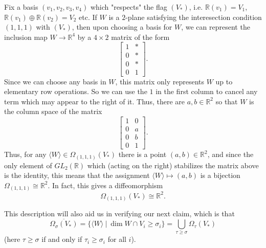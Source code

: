 \documentclass{amsart}          %
\begin{document}
Fix a basis $(v_1, v_2, v_3, v_4)$ which "respects" the flag $(V_{\ast})$, i.e. $\mathbb{R}(v_1) = V_1$, $\mathbb{R}(v_1) \oplus \mathbb{R}(v_2) = V_2$ etc. If $W$ is a $2$-plane satisfying the interesection condition $(1, 1, 1)$ with $(V_{\ast})$, then upon choosing a basis for $W$, we can represent the inclusion map $W\rightarrow \mathbb{R}^4$ by a $4\times 2$ matrix of the form
\[
\begin{bmatrix}
    1 & \ast \\
    0 & \ast \\
    0 & \ast \\
    0 & 1 
\end{bmatrix}.
\]
Since we can choose any basis in $W$, this matrix only represents $W$ up to elementary row operations. So we can use the $1$ in the first column to cancel any term which may appear to the right of it. Thus, there are $a, b\in \mathbb{R}^2$ so that $W$ is the column space of the matrix
\[
\begin{bmatrix}
    1 & 0 \\
    0 & a \\
    0 & b \\
    0 & 1 
\end{bmatrix}.
\]
Thus, for any $\langle W\rangle \in \Omega_{(1, 1, 1)}(V_{\ast})$ there is a point $(a, b)\in \mathbb{R}^2$, and since the only element of $GL_2(\mathbb{R})$ which (acting on the right) stabilizes the matrix above is the identity, this means that the assignment $\langle W\rangle\mapsto (a,b)$ is a bijection $\Omega_{(1,1,1)}\cong \mathbb{R}^2$. In fact, this gives a diffeomorphism
\[
\Omega_{(1,1,1)}(V_{\ast})\cong \mathbb{R}^2. 
\] 

This description will also aid us in verifying our next claim, which is that 
\[
\overline{\Omega_{\sigma}(V_{\ast})} =\lbrace \langle W\rangle \ | \ \dim W\cap V_i \ge \sigma_i\rbrace = \bigcup_{\tau \ge \sigma}\Omega_{\tau}(V_{\ast})
\] 
(here $\tau \ge \sigma$ if and only if $\tau_i \ge \sigma_i$ for all $i$). 
\end{document}
